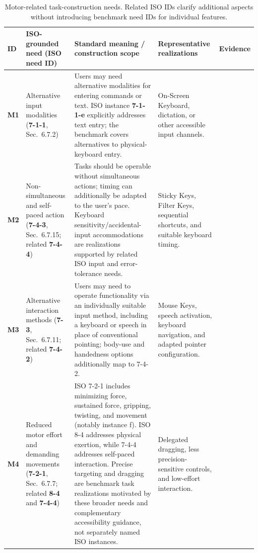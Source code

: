 \documentclass[11pt]{article}
\begin{document}
\begin{table}[t]
\centering
\scriptsize
\begin{tabularx}{\textwidth}{>{\bfseries}p{} p{} p{} X p{}}
\toprule
ID & ISO-grounded need (ISO need ID) & Standard meaning / construction scope & Representative realizations & Evidence \tabularnewline
\midrule
M1 & Alternative input modalities (\textbf{7-1-1}, Sec.~6.7.2) & Users may need alternative modalities for entering commands or text. ISO instance \textbf{7-1-1-e} explicitly addresses text entry; the benchmark covers alternatives to physical-keyboard entry. & On-Screen Keyboard, dictation, or other accessible input channels. & \citep{iso29138,webaimmotor,msmobility,w3cinput} \tabularnewline
M2 & Non-simultaneous and self-paced action (\textbf{7-4-3}, Sec.~6.7.15; related \textbf{7-4-4}) & Tasks should be operable without simultaneous actions; timing can additionally be adapted to the user's pace. Keyboard sensitivity/accidental-input accommodations are realizations supported by related ISO input and error-tolerance needs. & Sticky Keys, Filter Keys, sequential shortcuts, and suitable keyboard timing. & \citep{iso29138,msmobility,w3cphysical,w3cinput} \tabularnewline
M3 & Alternative interaction methods (\textbf{7-3}, Sec.~6.7.11; related \textbf{7-4-2}) & Users may need to operate functionality via an individually suitable input method, including a keyboard or speech in place of conventional pointing; body-use and handedness options additionally map to 7-4-2. & Mouse Keys, speech activation, keyboard navigation, and adapted pointer configuration. & \citep{iso29138,msmobility,webaimmotor,w3cphysical} \tabularnewline
M4 & Reduced motor effort and demanding movements (\textbf{7-2-1}, Sec.~6.7.7; related \textbf{8-4} and \textbf{7-4-4}) & ISO 7-2-1 includes minimizing force, sustained force, gripping, twisting, and movement (notably instance f). ISO 8-4 addresses physical exertion, while 7-4-4 addresses self-paced interaction. Precise targeting and dragging are benchmark task realizations motivated by these broader needs and complementary accessibility guidance, not separately named ISO instances. & Delegated dragging, less precision-sensitive controls, and low-effort interaction. & \citep{iso29138,webaimmotor,w3cdragging,w3cphysical} \tabularnewline
\bottomrule
\end{tabularx}
\caption{Motor-related task-construction needs. Related ISO IDs clarify additional aspects without introducing benchmark need IDs for individual features.}
\label{tab:motor_needs}
\end{table}
\end{document}
